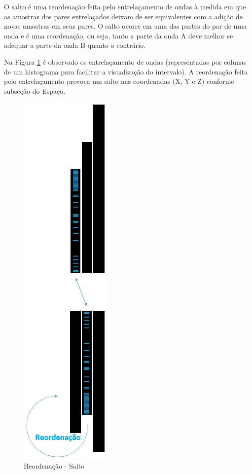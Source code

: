O salto é uma reordenação feita pelo entrelaçamento de ondas à medida em que as amostras dos pares entrelaçados deixam de ser equivalentes com a adição de novas amostras em seus pares. O salto ocorre em uma das partes do par de uma onda e é uma reordenação, ou seja, tanto a parte da onda A deve melhor se adequar a parte da onda B quanto o contrário. 

Na Figura \ref{fig:consciousness_space_subconscious_observation_jump} é observado os entrelaçamento de ondas (representadas por colunas de um histograma para facilitar a visualização do intervalo). A reordenação feita pelo entrelaçamento provoca um salto nas coordenadas (X, Y e Z) conforme subseção do Espaço.
	\begin{figure}[H]
	\caption{Reordenação - Salto}
	\label{fig:consciousness_space_subconscious_observation_jump}
	\centering
	\includegraphics[scale=.55]{sections/images/consciousness_space_subconscious_observation_jump.jpg}
	\end{figure}

